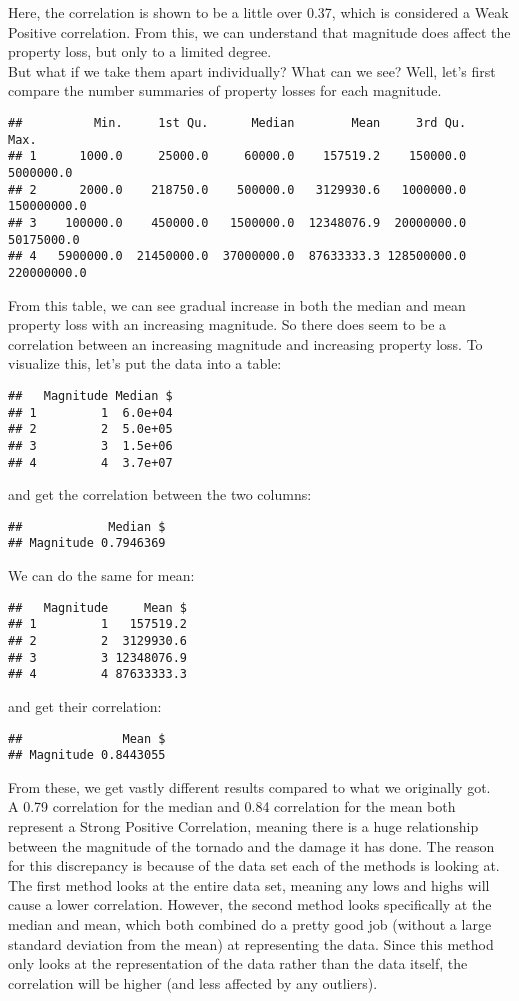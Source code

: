 \documentclass[
]{article}
\begin{document}
Here, the correlation is shown to be a little over 0.37, which is
considered a Weak Positive correlation. From this, we can understand
that magnitude does affect the property loss, but only to a limited
degree.\\
But what if we take them apart individually? What can we see? Well,
let's first compare the number summaries of property losses for each
magnitude.

\begin{verbatim}
##          Min.     1st Qu.      Median        Mean     3rd Qu.        Max.
## 1      1000.0     25000.0     60000.0    157519.2    150000.0   5000000.0
## 2      2000.0    218750.0    500000.0   3129930.6   1000000.0 150000000.0
## 3    100000.0    450000.0   1500000.0  12348076.9  20000000.0  50175000.0
## 4   5900000.0  21450000.0  37000000.0  87633333.3 128500000.0 220000000.0
\end{verbatim}

From this table, we can see gradual increase in both the median and mean
property loss with an increasing magnitude. So there does seem to be a
correlation between an increasing magnitude and increasing property
loss. To visualize this, let's put the data into a table:

\begin{verbatim}
##   Magnitude Median $
## 1         1  6.0e+04
## 2         2  5.0e+05
## 3         3  1.5e+06
## 4         4  3.7e+07
\end{verbatim}

and get the correlation between the two columns:

\begin{verbatim}
##            Median $
## Magnitude 0.7946369
\end{verbatim}

We can do the same for mean:

\begin{verbatim}
##   Magnitude     Mean $
## 1         1   157519.2
## 2         2  3129930.6
## 3         3 12348076.9
## 4         4 87633333.3
\end{verbatim}

and get their correlation:

\begin{verbatim}
##              Mean $
## Magnitude 0.8443055
\end{verbatim}

From these, we get vastly different results compared to what we
originally got.\\
A 0.79 correlation for the median and 0.84 correlation for the mean both
represent a Strong Positive Correlation, meaning there is a huge
relationship between the magnitude of the tornado and the damage it has
done. The reason for this discrepancy is because of the data set each of
the methods is looking at. The first method looks at the entire data
set, meaning any lows and highs will cause a lower correlation. However,
the second method looks specifically at the median and mean, which both
combined do a pretty good job (without a large standard deviation from
the mean) at representing the data. Since this method only looks at the
representation of the data rather than the data itself, the correlation
will be higher (and less affected by any outliers).
\end{document}
